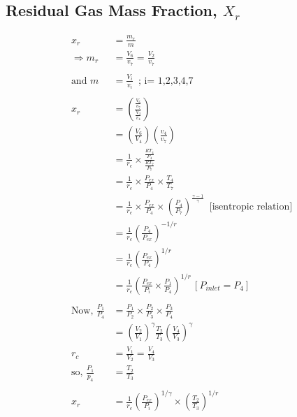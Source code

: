 \documentclass{article}
\begin{document}
	\begin{multicols}{2}
		\subsection*{Residual Gas Mass Fraction, $X_r$}
		

		\begin{align*}
			x_r &= \frac{m_{r}}{m} \\
			\Rightarrow m_r &= \frac{V_6}{v_7} = \frac{V_2}{v_7} \\
			&\\
			\text{and } m &= \frac{V_i}{v_i} \, \text{ ; i= 1,2,3,4,7}\\
			&\\
			x_r &= \left(\frac{\frac{V_6}{v_7}}{\frac{V_4}{v_4}}\right) \\
			&= \left(\frac{V_6}{V_4}\right) \left(\frac{v_4}{v_7}\right) \\
			&= \frac{1}{r_c} \times \frac{\frac{RT_4}{P_4}}{\frac{RT_7}{P_7}} \\
			&= \frac{1}{r_c} \times \frac{P_{ex}}{P_4} \times \frac{T_4}{T_7} \\
			&= \frac{1}{r_c} \times \frac{P_{ex}}{P_4} \times \left(\frac{P_4}{P_7}\right)^{\frac{\gamma -1}{\gamma}} \, \text{ [isentropic relation]} \\
			&= \frac{1}{r_c} \left(\frac{P_4}{P_{ex}}\right)^{-1/r} \\
			&= \frac{1}{r_c} \left(\frac{P_{ex}}{P_4}\right)^{1/r} \\
			&= \frac{1}{r_c} \left(\frac{P_{ex}}{P_i} \times \frac{P_1}{P_4}\right)^{1/r}\, [P_{inlet} = P_4] \\
			&\\
			\text{Now, } \frac{P_{1}}{P_4} &= \frac{P_1}{P_2} \times \frac{P_2}{P_3} \times \frac{P_3}{P_4} \\
			&= \left(\frac{V_2}{V_1}\right)^\gamma \frac{T_2}{T_3} \left(\frac{V_4}{V_3}\right)^\gamma \\
			r_c &= \frac{V_1}{V_2} = \frac{V_4}{V_3} \\
			\text{so, } \frac{P_1}{p_4} &= \frac{T_2}{T_3} \\
			&\\
			x_r &= \frac{1}{r_c} \left(\frac{P_{ex}}{P_i}\right)^{1/\gamma} \times \left(\frac{T_2}{T_3}\right)^{1/r} \\ 
		\end{align*}


\end{multicols}
\end{document}
